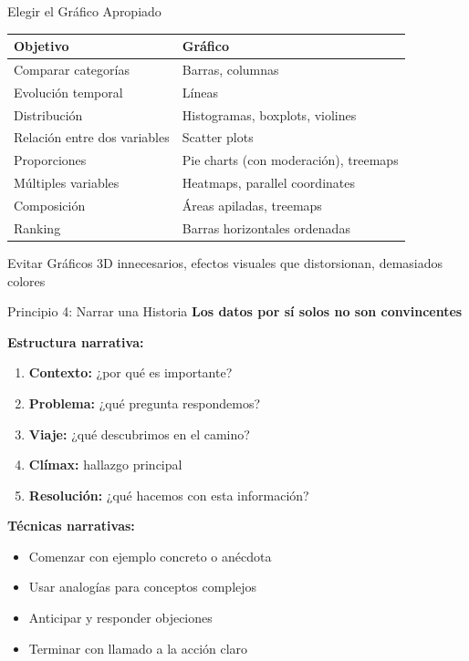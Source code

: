 \documentclass[aspectratio=169]{beamer}
\begin{document}
\begin{frame}{Elegir el Gráfico Apropiado}
\begin{table}
\small
\begin{tabular}{ll}
\toprule
\textbf{Objetivo} & \textbf{Gráfico} \\
\midrule
Comparar categorías & Barras, columnas \\
Evolución temporal & Líneas \\
Distribución & Histogramas, boxplots, violines \\
Relación entre dos variables & Scatter plots \\
Proporciones & Pie charts (con moderación), treemaps \\
Múltiples variables & Heatmaps, parallel coordinates \\
Composición & Áreas apiladas, treemaps \\
Ranking & Barras horizontales ordenadas \\
\bottomrule
\end{tabular}
\end{table}

\vspace{0.3cm}

\begin{alertblock}{Evitar}
Gráficos 3D innecesarios, efectos visuales que distorsionan, demasiados colores
\end{alertblock}
\end{frame}

\begin{frame}{Principio 4: Narrar una Historia}
\textbf{Los datos por sí solos no son convincentes}

\vspace{0.3cm}

\textbf{Estructura narrativa:}
\begin{enumerate}
\item \textbf{Contexto:} ¿por qué es importante?
\item \textbf{Problema:} ¿qué pregunta respondemos?
\item \textbf{Viaje:} ¿qué descubrimos en el camino?
\item \textbf{Clímax:} hallazgo principal
\item \textbf{Resolución:} ¿qué hacemos con esta información?
\end{enumerate}

\vspace{0.3cm}

\textbf{Técnicas narrativas:}
\begin{itemize}
\item Comenzar con ejemplo concreto o anécdota
\item Usar analogías para conceptos complejos
\item Anticipar y responder objeciones
\item Terminar con llamado a la acción claro
\end{itemize}
\end{frame}
\end{document}
